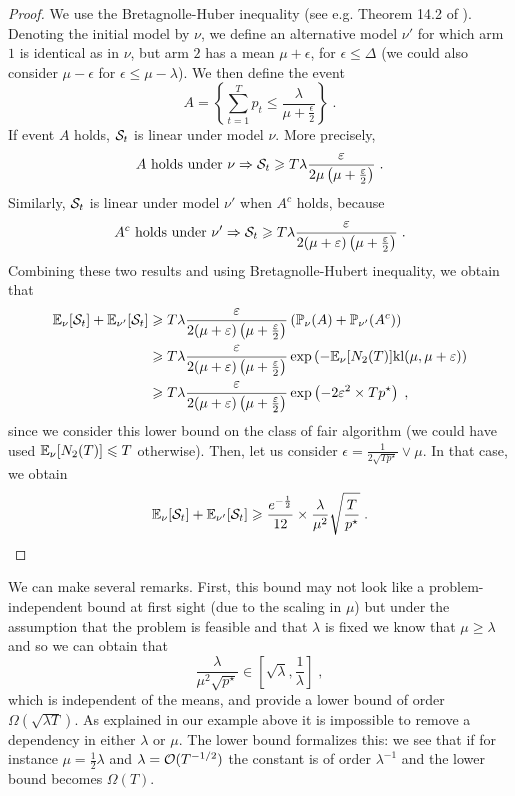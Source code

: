 \begin{proof}
	We use the Bretagnolle-Huber inequality (see e.g. Theorem 14.2 of \cite{BanditBook}). Denoting the initial model by $\nu$, we define an alternative model $\nu'$ for which arm $1$ is identical as in $\nu$, but arm $2$ has a mean $\mu+\epsilon$, for $\epsilon\leq \Delta$ (we could also consider $\mu-\epsilon$ for $\epsilon \leq\mu-\lambda$). We then define the event \[A = \left\{ \sum_{t=1}^T p_t \leq \frac{\lambda}{\mu+\frac{\epsilon}{2}} \right\} \;. \]
If event $A$ holds, $\mathcal{S}_t$ is linear under model $\nu$. More precisely,
\[ A \text{ holds under } \nu \Rightarrow \mathcal{S}_t \geqslant T\lambda \frac{\varepsilon}{2\mu\left(\mu+\frac{\varepsilon}{2}\right)} \;. \]
Similarly, $\mathcal{S}_t$ is linear under model $\nu'$ when $A^c$ holds, because
\[ A^c \text{ holds under } \nu' \Rightarrow \mathcal{S}_t \geqslant T\lambda \frac{\varepsilon}{2(\mu+\varepsilon)\left(\mu+\frac{\varepsilon}{2}\right)} \;. \]
Combining these two results and using Bretagnolle-Hubert inequality, we obtain that 
\begin{align*}
\mathbb{E}_\nu[\mathcal{S}_t] + \mathbb{E}_{\nu'}[\mathcal{S}_t] & \geqslant T\lambda \frac{\varepsilon}{2(\mu+\varepsilon)\left(\mu+\frac{\varepsilon}{2}\right)}\left(\mathbb{P}_\nu(A) + \mathbb{P}_{\nu'}(A^c)\right) \\
& \geqslant T\lambda \frac{\varepsilon}{2(\mu+\varepsilon)\left(\mu+\frac{\varepsilon}{2}\right)} \exp\left(- \mathbb{E}_{\nu}[N_2(T)] \text{\normalfont kl}(\mu, \mu+\varepsilon)\right) \\
& \geqslant T\lambda \frac{\varepsilon}{2(\mu+\varepsilon)\left(\mu+\frac{\varepsilon}{2}\right)} \exp\left(-2\varepsilon^2 \times T p^\star \right) \;,
\end{align*}
since we consider this lower bound on the class of fair algorithm (we could have used $\mathbb{E}_\nu[N_2(T)]\leqslant T$ otherwise). Then, let us consider $\epsilon = \frac{1}{2\sqrt{Tp^\star}}\vee \mu$. In that case, we obtain 
\[\mathbb{E}_\nu[\mathcal{S}_t] + \mathbb{E}_{\nu'}[\mathcal{S}_t] \geqslant \frac{e^{-\frac{1}{2}} }{12} \times \frac{\lambda}{\mu^2} \sqrt{\frac{T}{p^\star}}\;. \]

\end{proof}

We can make several remarks. First, this bound may not look like a problem-independent bound at first sight (due to the scaling in $\mu$) but under the assumption that the problem is feasible and that $\lambda$ is fixed we know that $\mu\geq \lambda$ and so we can obtain that 
\[\frac{\lambda}{\mu^2 \sqrt{p^\star}} \in \left[\sqrt{\lambda}, \frac{1}{\lambda}\right] \;, \] 
which is independent of the means, and provide a lower bound of order $\Omega(\sqrt{\lambda T})$. As explained in our example above it is impossible to remove a dependency in either $\lambda$ or $\mu$. The lower bound formalizes this: we see that if for instance $\mu=\frac{1}{2} \lambda$ and $\lambda= \mathcal{O}(T^{-1/2})$ the constant is of order $\lambda^{-1}$ and the lower bound becomes $\Omega(T)$.

